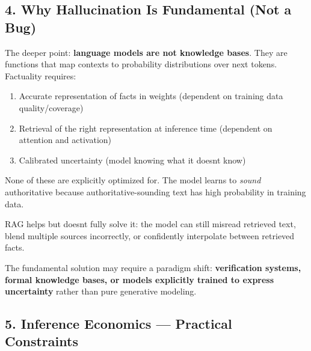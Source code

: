 \documentclass[11pt]{article}
\providecommand{\tightlist}{\setlength{\itemsep}{1pt}\setlength{\parskip}{0pt}}
\begin{document}
\subsection{4. Why Hallucination Is Fundamental (Not a Bug)}\label{4-why-hallucination-is-fundamental-not-a-bug}

The deeper point: \textbf{language models are not knowledge bases}. They are functions that map contexts to probability distributions over next tokens. Factuality requires:

\begin{enumerate}
\def\labelenumi{\arabic{enumi}.}
\tightlist
\item
  Accurate representation of facts in weights (dependent on training data quality/coverage)
\item
  Retrieval of the right representation at inference time (dependent on attention and activation)
\item
  Calibrated uncertainty (model knowing what it doesn\textquotesingle t know)
\end{enumerate}

None of these are explicitly optimized for. The model learns to \emph{sound} authoritative because authoritative-sounding text has high probability in training data.

RAG helps but doesn\textquotesingle t fully solve it: the model can still misread retrieved text, blend multiple sources incorrectly, or confidently interpolate between retrieved facts.

The fundamental solution may require a paradigm shift: \textbf{verification systems, formal knowledge bases, or models explicitly trained to express uncertainty} rather than pure generative modeling.

\subsection{5. Inference Economics --- Practical Constraints}\label{5-inference-economics--practical-constraints}

\end{document}
